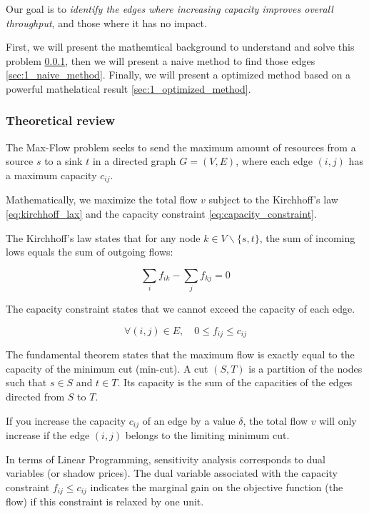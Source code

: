 \documentclass[12pt, openany]{article}
\begin{document}
Our goal is to \emph{identify the edges where increasing capacity improves overall throughput}, and those where it has no impact.

First, we will present the mathemtical background to understand and solve this problem \ref{sec:1_theoretical_review}, then we will present a naive method to find those edges \ref{sec:1_naive_method}. Finally, we will present a optimized method based on a powerful mathelatical result \ref{sec:1_optimized_method}.

\subsubsection{Theoretical review}\label{sec:1_theoretical_review}

The Max-Flow problem seeks to send the maximum amount of resources from a source $s$ to a sink $t$ in a directed graph $G=(V,E)$, where each edge $(i,j)$ has a maximum capacity $c_{ij}$.

Mathematically, we maximize the total flow $v$ subject to the Kirchhoff's law \eqref{eq:kirchhoff_lax} and the capacity constraint \eqref{eq:capacity_constraint}.

The Kirchhoff's law states that for any node $k \in V \backslash \{s,t\}$, the sum of incoming lows equals the sum of outgoing flows:

\begin{equation}\label{eq:kirchhoff_lax}
    \sum_i f_{ik} - \sum_j f_{kj} = 0
\end{equation}

The capacity constraint states that we cannot exceed the capacity of each edge.

\begin{equation}\label{eq:capacity_constraint}
    \forall (i,j) \in E, \quad 0 \leq f_{ij} \leq c_{ij}
\end{equation}

The fundamental theorem states that the maximum flow is exactly equal to the capacity of the minimum cut (min-cut). A cut $(S,T)$ is a partition of the nodes such that $s \in S$ and $t\in T$. Its capacity is the sum of the capacities of the edges directed from $S$ to $T$.

If you increase the capacity $c_{ij}$ of an edge by a value $\delta$, the total flow $v$ will only increase if the edge $(i,j)$ belongs to the limiting minimum cut.

In terms of Linear Programming, sensitivity analysis corresponds to dual variables (or shadow prices). The dual variable associated with the capacity constraint $f_{ij} \leq c_{ij}$ indicates the marginal gain on the objective function (the flow) if this constraint is relaxed by one unit.
\end{document}
